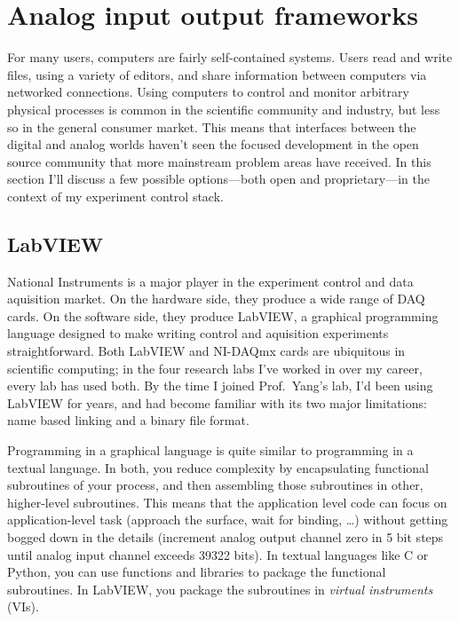 \section{Analog input output frameworks}
\label{sec:aio-frameworks}

For many users, computers are fairly self-contained systems.  Users
read and write files, using a variety of editors, and share
information between computers via networked connections.  Using
computers to control and monitor arbitrary physical processes is
common in the scientific community and industry, but less so in the
general consumer market.  This means that interfaces between the
digital and analog worlds haven't seen the focused development in the
open source community that more mainstream problem areas have
received.  In this section I'll discuss a few possible options---both
open and proprietary---in the context of my experiment control stack.

\subsection{LabVIEW}
\label{sec:labview}

National Instruments\citep{national-instruments} is a major player in
the experiment control and data aquisition market.  On the hardware
side, they produce a wide range of DAQ cards.  On the software side,
they produce LabVIEW\citep{labview}, a graphical programming language
designed to make writing control and aquisition experiments
straightforward.  Both LabVIEW and NI-DAQmx cards are ubiquitous in
scientific computing; in the four research labs I've worked in over my
career, every lab has used both.  By the time I joined Prof.~Yang's
lab, I'd been using LabVIEW for years, and had become familiar with
its two major limitations: name based linking and a binary file
format.
%

Programming in a graphical language is quite similar to programming in
a textual language.  In both, you reduce complexity by encapsulating
functional subroutines of your process, and then assembling those
subroutines in other, higher-level
subroutines\citep{dijkstra70,wirth74,shneiderman79,hughes89}.  This
means that the application level code can focus on application-level
task (approach the surface, wait for binding, \ldots) without getting
bogged down in the details (increment analog output channel zero in 5
bit steps until analog input channel exceeds 39322 bits).  In textual
languages like C or Python, you can use functions and libraries to
package the functional subroutines.  In LabVIEW, you package the
subroutines in \emph{virtual instruments} (VIs).


